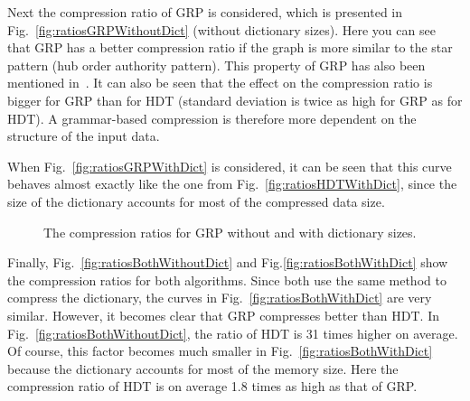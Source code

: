 Next the compression ratio of GRP is considered, which is presented in Fig.~\ref{fig:ratiosGRPWithoutDict} (without dictionary sizes). Here you can see that GRP has a better compression ratio if the graph is more similar to the star pattern (hub order authority pattern). This property of GRP has also been mentioned in~\cite{maneth}. It can also be seen that the effect on the compression ratio is bigger for GRP than for HDT (standard deviation is twice as high for GRP as for HDT). A grammar-based compression is therefore more dependent on the structure of the input data.

When Fig.~\ref{fig:ratiosGRPWithDict} is considered, it can be seen that this curve behaves almost exactly like the one from Fig.~\ref{fig:ratiosHDTWithDict}, since the size of the dictionary accounts for most of the compressed data size.

\begin{figure}[h]
	\centering
	\hfill
	\caption{The compression ratios for GRP without and with dictionary sizes.}
\end{figure}

Finally, Fig.~\ref{fig:ratiosBothWithoutDict} and Fig.\ref{fig:ratiosBothWithDict} show the compression ratios for both algorithms. Since both use the same method to compress the dictionary, the curves in Fig.~\ref{fig:ratiosBothWithDict} are very similar. However, it becomes clear that GRP compresses better than HDT. In Fig.~\ref{fig:ratiosBothWithoutDict}, the ratio of HDT is 31 times higher on average. Of course, this factor becomes much smaller in Fig.~\ref{fig:ratiosBothWithDict} because the dictionary accounts for most of the memory size. Here the compression ratio of HDT is on average 1.8 times as high as that of GRP.

